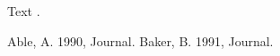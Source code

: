 
Text \cite{a}.
\begin{thebibliography}{}
 Able, A. 1990, Journal.
 Baker, B. 1991, Journal.
\end{thebibliography}

